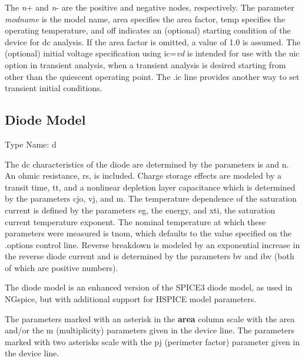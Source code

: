 
The {\it n\/}{\vt +} and {\it n\/}{\vt -} are the positive and
negative nodes, respectively.  The parameter {\it modname} is the
model name, {\vt area} specifies the area factor, {\vt temp}
specifies the operating temperature, and {\vt off} indicates an
(optional) starting condition of the device for dc analysis.  If the
area factor is omitted, a value of 1.0 is assumed.  The (optional)
initial voltage specification using {\vt ic}={\it vd\/} is intended
for use with the {\vt uic} option in transient analysis, when a
transient analysis is desired starting from other than the quiescent
operating point.  The {\vt .ic} line provides another way to set
transient initial conditions.

\subsection{Diode Model}
\label{diomodel}


{\cb Type Name:} {\vt d}

The dc characteristics of the diode are determined by the parameters
{\vt is} and {\vt n}.  An ohmic resistance, {\vt rs}, is included.
Charge storage effects are modeled by a transit time, {\vt tt}, and a
nonlinear depletion layer capacitance which is determined by the
parameters {\vt cjo}, {\vt vj}, and {\vt m}.  The temperature
dependence of the saturation current is defined by the parameters {\vt
eg}, the energy, and {\vt xti}, the saturation current temperature
exponent.  The nominal temperature at which these parameters were
measured is {\vt tnom}, which defaults to the value
specified on the {\vt .options} control line.  Reverse breakdown is
modeled by an exponential increase in the reverse diode current and is
determined by the parameters {\vt bv} and {\vt ibv} (both of which are
positive numbers).

The diode model is an enhanced version of the SPICE3 diode model, as
used in NGspice, but with additional support for HSPICE model
parameters.

The parameters marked with an asterisk in the {\bf area} column scale
with the {\vt area} and/or the {\vt m} (multiplicity) parameters given
in the device line.  The parameters marked with two asterisks scale
with the {\vt pj} (perimeter factor) parameter given in the device
line.

